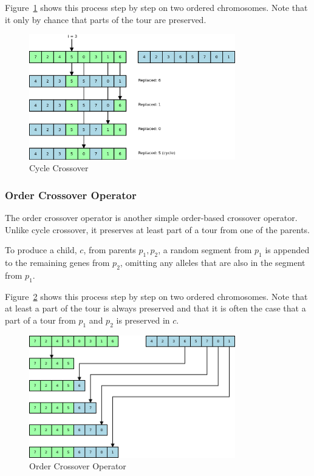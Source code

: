 \documentclass[10pt, a4paper]{article}
\begin{document}
Figure~\ref{fig:cycle-crossover} shows this process step by step on two ordered
chromosomes. Note that it only by chance that parts of the tour are preserved.

\begin{figure}[h]
\centering
\includegraphics[width=0.8\textwidth]{img/cycle-crossover.png}
\caption{Cycle Crossover}
\label{fig:cycle-crossover}
\end{figure}


\subsubsection{Order Crossover Operator}

The order crossover operator is another simple order-based crossover operator.
Unlike cycle crossover, it preserves at least part of a tour from one of the
parents.

To produce a child, $c$, from parents $p_1, p_2$, a random segment from $p_1$ 
is appended to the remaining genes from $p_2$, omitting any alleles that are
also in the segment from $p_1$.

Figure~\ref{fig:order-crossover-operator} shows this process step by step on
two ordered chromosomes. Note that at least a part of the tour is always
preserved and that it is often the case that a part of a tour from $p_1$ and
$p_2$ is preserved in $c$.

\begin{figure}[h]
\centering
\includegraphics[width=0.8\textwidth]{img/order-crossover-operator}
\caption{Order Crossover Operator}
\label{fig:order-crossover-operator}
\end{figure}
\end{document}
